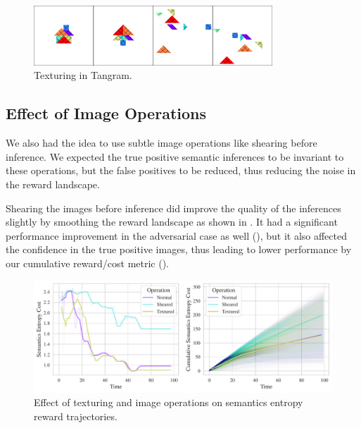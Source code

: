 \begin{figure}[H]
    \centering
    \includegraphics[width=0.8\textwidth]{images/hatched.pdf}
    \caption{Texturing in Tangram.}
    \label{fig:texturing}
\end{figure}

\subsection{Effect of Image Operations}
\label{sec:image-operations}
We also had the idea to use subtle image operations like shearing before inference.
We expected the true positive semantic inferences to be invariant to these operations, but the false positives to be reduced, thus reducing the noise in the reward landscape.

Shearing the images before inference did improve the quality of the inferences slightly by smoothing the reward landscape as shown in .
It had a significant performance improvement in the adversarial case as well (), but it also affected the confidence in the true positive images, thus leading to lower performance by our cumulative reward/cost metric ().

\begin{figure}[H]
    \centering
    \includegraphics[width=\textwidth]{images/texturing_operations_comparison.pdf}
    \caption{Effect of texturing and image operations on semantics entropy reward trajectories.}
    \label{fig:texturing-operations}
\end{figure}

